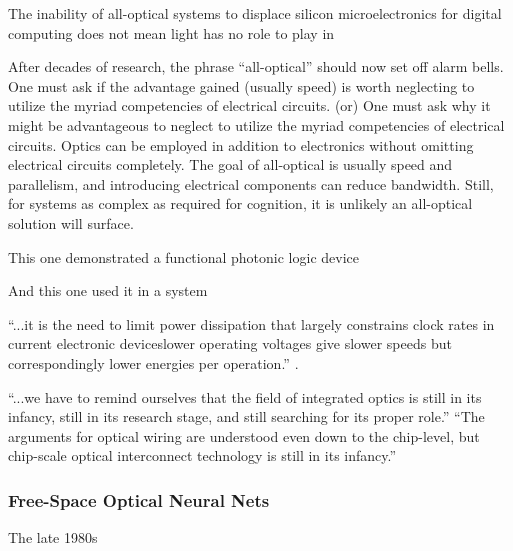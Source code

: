 The inability of all-optical systems to displace silicon microelectronics for digital computing does not mean light has no role to play in 

\vspace{3em}
After decades of research, the phrase ``all-optical'' should now set off alarm bells. One must ask if the advantage gained (usually speed) is worth neglecting to utilize the myriad competencies of electrical circuits. (or) One must ask why it might be advantageous to neglect to utilize the myriad competencies of electrical circuits. Optics can be employed in addition to electronics without omitting electrical circuits completely. The goal of all-optical is usually speed and parallelism, and introducing electrical components can reduce bandwidth. Still, for systems as complex as required for cognition, it is unlikely an all-optical solution will surface.

\vspace{3em}
This one demonstrated a functional photonic logic device
\cite{lehi1989}

And this one used it in a system
\cite{mccl1993}

\vspace{3em}
``...it is the need to limit power dissipation that largely constrains clock rates in current electronic devices\textemdash lower operating voltages give slower speeds but correspondingly lower energies per operation.'' \cite{mi2010}.

\vspace{3em}
``...we have to remind ourselves that the field of integrated optics is still in its infancy, still in its research stage, and still searching for its proper role.'' \cite{ko1981}
``The arguments for optical wiring are understood even down to the chip-level, but chip-scale optical interconnect technology is still in its infancy.'' \cite{mi2010}

\subsubsection{Free-Space Optical Neural Nets}
The late 1980s 

